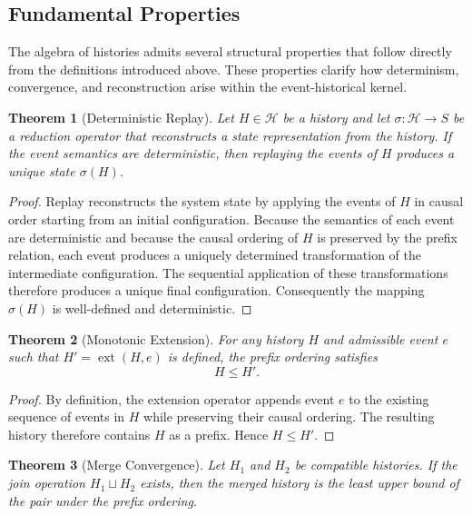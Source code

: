 \documentclass[12pt]{article}
\newtheorem{theorem}{Theorem}
\begin{document}

\subsection{Fundamental Properties}

The algebra of histories admits several structural
properties that follow directly from the definitions
introduced above. These properties clarify how
determinism, convergence, and reconstruction arise
within the event-historical kernel.

\begin{theorem}[Deterministic Replay]
Let $H \in \mathcal{H}$ be a history and let
$\sigma : \mathcal{H} \rightarrow S$ be a reduction
operator that reconstructs a state representation
from the history. If the event semantics are
deterministic, then replaying the events of $H$
produces a unique state $\sigma(H)$.
\end{theorem}

\begin{proof}
Replay reconstructs the system state by applying
the events of $H$ in causal order starting from an
initial configuration. Because the semantics of
each event are deterministic and because the causal
ordering of $H$ is preserved by the prefix relation,
each event produces a uniquely determined
transformation of the intermediate configuration.
The sequential application of these transformations
therefore produces a unique final configuration.
Consequently the mapping $\sigma(H)$ is well-defined
and deterministic.
\end{proof}

\begin{theorem}[Monotonic Extension]
For any history $H$ and admissible event $e$ such that
$H' = \operatorname{ext}(H,e)$ is defined, the prefix
ordering satisfies
\[
H \leq H'.
\]
\end{theorem}

\begin{proof}
By definition, the extension operator appends event $e$
to the existing sequence of events in $H$ while preserving
their causal ordering. The resulting history therefore
contains $H$ as a prefix. Hence $H \leq H'$.
\end{proof}

\begin{theorem}[Merge Convergence]
Let $H_1$ and $H_2$ be compatible histories.
If the join operation $H_1 \sqcup H_2$ exists,
then the merged history is the least upper bound
of the pair under the prefix ordering.
\end{theorem}
\end{document}
